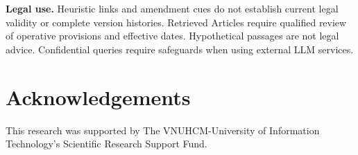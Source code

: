 \documentclass[runningheads,a4paper]{llncs}
\begin{document}
\noindent\textbf{Legal use.} Heuristic links and amendment cues do not establish current legal validity or complete version histories. Retrieved Articles require qualified review of operative provisions and effective dates. Hypothetical passages are not legal advice. Confidential queries require safeguards when using external LLM services.

\section*{Acknowledgements}
This research was supported by The VNUHCM-University of Information Technology's Scientific Research Support Fund.

\begingroup
{}


\endgroup
\end{document}
